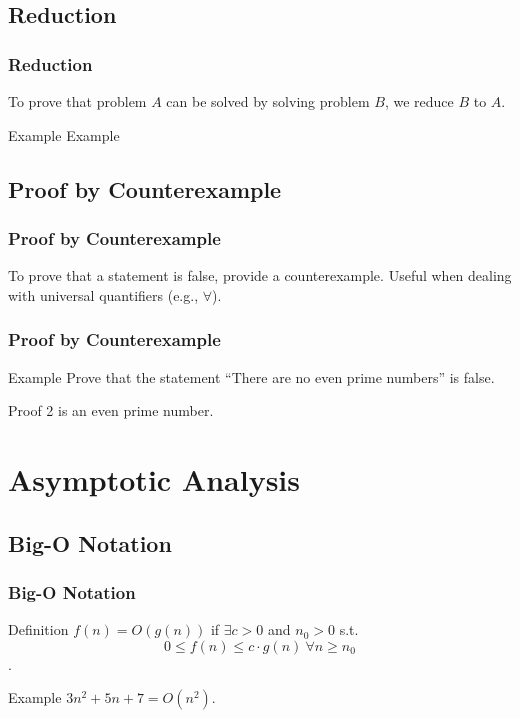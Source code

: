 \documentclass[t]{beamer}
\begin{document}
        \subsection{Reduction}
            \begin{frame}
                \frametitle{Reduction}
                To prove that problem $A$ can be solved by solving problem $B$, we reduce $B$ to $A$.

                \begin{block}{Example}
                    Example \cdot
                \end{block}
            \end{frame}


        \subsection{Proof by Counterexample}
            \begin{frame}
                \frametitle{Proof by Counterexample}
                To prove that a statement is false, provide a counterexample. Useful when dealing 
                with universal quantifiers (e.g., $\forall$).
            \end{frame}

            \begin{frame}
                \frametitle{Proof by Counterexample}
                \begin{block}{Example}
                    Prove that the statement ``There are no even prime numbers'' is false.
                \end{block}
                \begin{block}{Proof}
                    2 is an even prime number.
                \end{block}
            \end{frame}

    \section{Asymptotic Analysis}


        \subsection{Big-O Notation}
            \begin{frame}
                \frametitle{Big-O Notation}
                \begin{block}{Definition}
                    $f(n) = O(g(n))$ if $\exists c > 0$ and $n_0 > 0$ s.t. \[0 \leq f(n) \leq c \cdot g(n)\ \forall n \geq n_0\].
                \end{block}

                \begin{block}{Example}
                    $3n^2 + 5n + 7 = O(n^2)$.
                \end{block}
            \end{frame}
\end{document}
